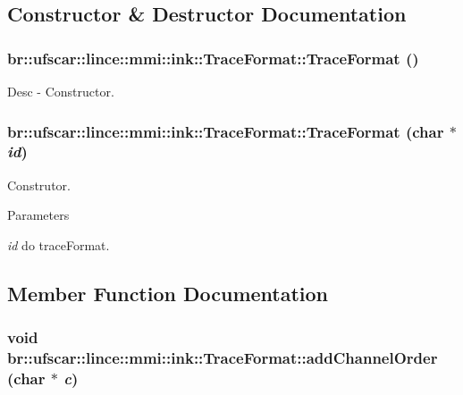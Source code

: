\subsection{Constructor \& Destructor Documentation}
\hypertarget{classbr_1_1ufscar_1_1lince_1_1mmi_1_1ink_1_1TraceFormat_a94ab4a2d743d17fb14c2af98a62b0550}{
\subsubsection[{TraceFormat}]{\setlength{\rightskip}{0pt plus 5cm}br::ufscar::lince::mmi::ink::TraceFormat::TraceFormat ()}}
\label{classbr_1_1ufscar_1_1lince_1_1mmi_1_1ink_1_1TraceFormat_a94ab4a2d743d17fb14c2af98a62b0550}


Desc -\/ Constructor. 

\hypertarget{classbr_1_1ufscar_1_1lince_1_1mmi_1_1ink_1_1TraceFormat_ae3d05ea0cfd71e7af419ddc36b05cdc8}{
\subsubsection[{TraceFormat}]{\setlength{\rightskip}{0pt plus 5cm}br::ufscar::lince::mmi::ink::TraceFormat::TraceFormat (char $\ast$ {\em id})}}
\label{classbr_1_1ufscar_1_1lince_1_1mmi_1_1ink_1_1TraceFormat_ae3d05ea0cfd71e7af419ddc36b05cdc8}


Construtor. 


\begin{DoxyParams}{Parameters}
\item[{\em id}]do traceFormat. \end{DoxyParams}


\subsection{Member Function Documentation}
\hypertarget{classbr_1_1ufscar_1_1lince_1_1mmi_1_1ink_1_1TraceFormat_a5427bd1c07566f405591f38dfd2ec5f9}{
\subsubsection[{addChannelOrder}]{\setlength{\rightskip}{0pt plus 5cm}void br::ufscar::lince::mmi::ink::TraceFormat::addChannelOrder (char $\ast$ {\em c})}}
\label{classbr_1_1ufscar_1_1lince_1_1mmi_1_1ink_1_1TraceFormat_a5427bd1c07566f405591f38dfd2ec5f9}


